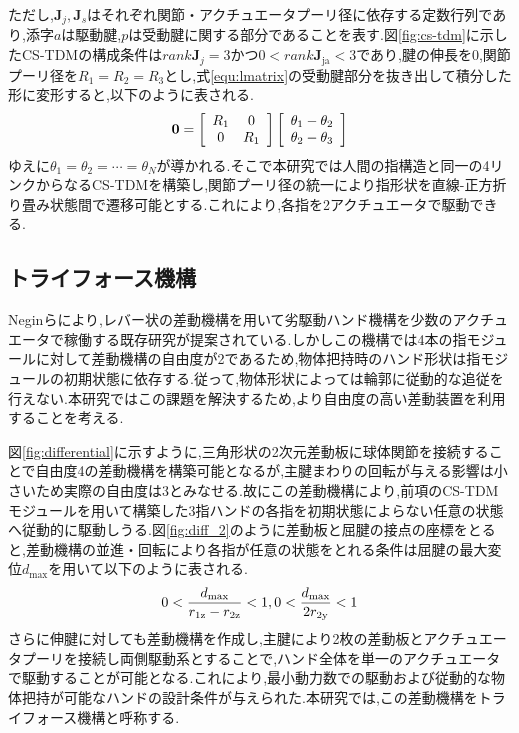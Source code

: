 \documentclass{jarticle}
\begin{document}
ただし,$\bm{J}_j,\bm{J}_s$はそれぞれ関節・アクチュエータプーリ径に依存する定数行列であり,添字$a$は駆動腱,$p$は受動腱に関する部分であることを表す.図\ref{fig:cs-tdm}に示したCS-TDMの構成条件は$rank\bm{J}_j = 3$かつ$0 < rank\bm{J}_\text{ja} < 3$であり,腱の伸長を0,関節プーリ径を$R_1 = R_2 = R_3$とし,式\ref{equ:lmatrix}の受動腱部分を抜き出して積分した形に変形すると,以下のように表される.
\vspace{-2mm}
\begin{equation}
  \bm{0} = \left[ \begin{array}{cccc} R_1 & 0 \\
    0 & R_1
  \end{array} \right]
  \left[ \begin{array}{c} \theta_1 - \theta_2 \\
    \theta_2 - \theta_3
  \end{array} \right]
  \label{passivematrixshort}
  \vspace{-2mm}
\end{equation}
ゆえに$\theta_1 = \theta_2 = \cdots = \theta_N$が導かれる.そこで本研究では人間の指構造と同一の4リンクからなるCS-TDMを構築し,関節プーリ径の統一により指形状を直線-正方折り畳み状態間で遷移可能とする.これにより,各指を2アクチュエータで駆動できる.

\subsection{トライフォース機構}
Neginらにより,レバー状の差動機構を用いて劣駆動ハンド機構を少数のアクチュエータで稼働する既存研究が提案されている\cite{differential}.しかしこの機構では4本の指モジュールに対して差動機構の自由度が2であるため,物体把持時のハンド形状は指モジュールの初期状態に依存する.従って,物体形状によっては輪郭に従動的な追従を行えない.本研究ではこの課題を解決するため,より自由度の高い差動装置を利用することを考える.

図\ref{fig:differential}に示すように,三角形状の2次元差動板に球体関節を接続することで自由度4の差動機構を構築可能となるが,主腱まわりの回転が与える影響は小さいため実際の自由度は3とみなせる.故にこの差動機構により,前項のCS-TDMモジュールを用いて構築した3指ハンドの各指を初期状態によらない任意の状態へ従動的に駆動しうる.図\ref{fig:diff_2}のように差動板と屈腱の接点の座標をとると,差動機構の並進・回転により各指が任意の状態をとれる条件は屈腱の最大変位$d_\text{max}$を用いて以下のように表される.
\vspace{-2mm}
\begin{equation}
  0 < \frac{d_{\text{max}}}{r_{\text{1z}} - r_{\text{2z}}} < 1,0 < \frac{d_{\text{max}}}{2r_{\text{2y}}} < 1
  \label{equ:jouken}
  \vspace{-2mm}
\end{equation}
さらに伸腱に対しても差動機構を作成し,主腱により2枚の差動板とアクチュエータプーリを接続し両側駆動系とすることで,ハンド全体を単一のアクチュエータで駆動することが可能となる.これにより,最小動力数での駆動および従動的な物体把持が可能なハンドの設計条件が与えられた.本研究では,この差動機構をトライフォース機構と呼称する.
\end{document}
